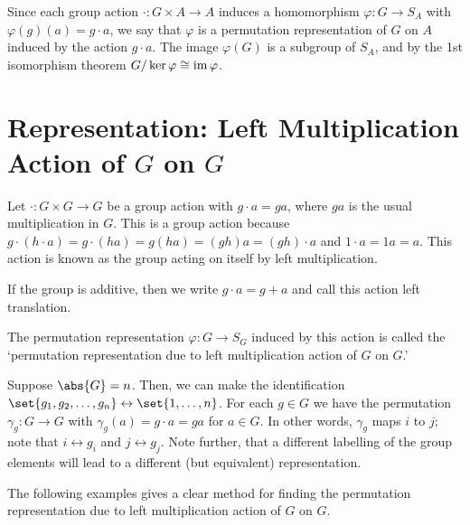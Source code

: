 \documentclass[11pt]{penrose}
\begin{document}
Since each group action $\cdot : G \times A \to A$ induces a homomorphism $\varphi: G \to S_{A}$ with $\varphi(g)(a) = g \cdot a$, we say that $\varphi$ is a permutation representation of $G$ on $A$ induced by the action $g \cdot a$. The image $\varphi(G)$ is a subgroup of $S_{A}$, and by the 1st isomorphism theorem $G / \ker \varphi \mathrel{\cong} \operatorname{im} \varphi$.

\section{Representation: Left Multiplication Action of \texorpdfstring{$G$}{G} on \texorpdfstring{$G$}{G}}

Let $\cdot : G \times G \to G$ be a group action with $g \cdot a = ga$, where $ga$ is the usual multiplication in $G$. This is a group action because $g \cdot (h \cdot a) = g \cdot (ha) = g(ha) = (gh)a = (gh) \cdot a$ and $1 \cdot a = 1a = a$. This action is known as the group acting on itself by left multiplication.

If the group is additive, then we write $g \cdot a = g + a$ and call this action left translation.

The permutation representation $\varphi : G \to S_{G}$ induced by this action is called the `permutation representation due to left multiplication action of $G$ on $G$.'

Suppose $\abs{G} = n$. Then, we can make the identification $\set{g_{1}, g_{2}, \dots, g_{n}} \leftrightarrow \set{1, \dots, n}$. For each $g \in G$ we have the permutation $\gamma_{g} : G \to G$ with $\gamma_{g}(a) = g \cdot a = ga$ for $a \in G$. In other words, $\gamma_{g}$ maps $i$ to $j$; note that $i \leftrightarrow g_{i}$ and $j \leftrightarrow g_{j}$. Note further, that a different labelling of the group elements will lead to a different (but equivalent) representation.

The following examples gives a clear method for finding the permutation representation due to left multiplication action of $G$ on $G$.
\end{document}
